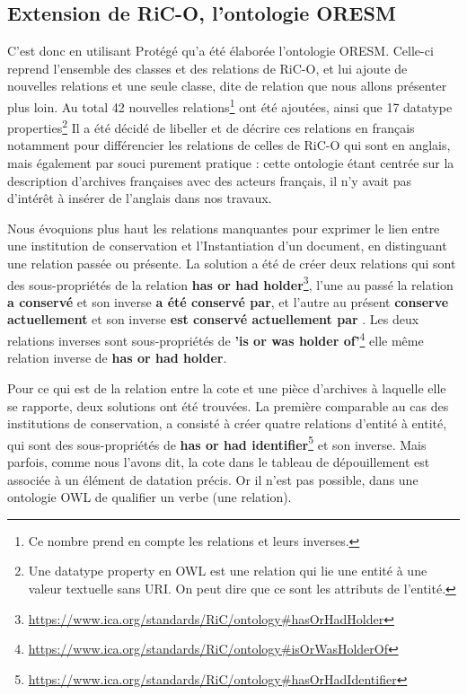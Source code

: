 \subsection{Extension de RiC-O, l'ontologie ORESM}
C'est donc en utilisant Protégé qu'a été élaborée l'ontologie ORESM. Celle-ci reprend l'ensemble des classes et des relations de RiC-O, et lui ajoute de nouvelles relations et une seule classe, dite de relation que nous allons présenter plus loin. Au total 42 nouvelles relations\footnote{Ce nombre prend en compte les relations et leurs inverses.} ont été ajoutées, ainsi que 17 datatype properties\footnote{Une datatype property en OWL est une relation qui lie une entité à une valeur textuelle sans URI. On peut dire que ce sont les attributs de l'entité.} Il a été décidé de libeller et de décrire ces relations en français notamment pour différencier les relations de celles de RiC-O qui sont en anglais, mais également par souci purement pratique : cette ontologie étant centrée sur la description d'archives françaises avec des acteurs français, il n'y avait pas d'intérêt à insérer de l'anglais dans nos travaux. 
\par
Nous évoquions plus haut les relations manquantes pour exprimer le lien entre une institution de conservation et l'Instantiation d'un document, en distinguant une relation passée ou présente. La solution a été de créer deux relations qui sont des sous-propriétés de la relation \textbf{has or had holder}\footnote{\href{https://www.ica.org/standards/RiC/ontology\#hasOrHadHolder}{https://www.ica.org/standards/RiC/ontology\#hasOrHadHolder}}, l'une au passé la relation \textbf{a conservé} et son inverse \textbf{a été conservé par}, et l'autre au présent \textbf{conserve actuellement} et son inverse \textbf{est conservé actuellement par} . Les deux relations inverses sont sous-propriétés de \textbf{'is or was holder of'}\footnote{\href{https://www.ica.org/standards/RiC/ontology\#isOrWasHolderOf}{https://www.ica.org/standards/RiC/ontology\#isOrWasHolderOf}} elle même relation inverse de \textbf{has or had holder}.
\par
Pour ce qui est de la relation entre la cote et une pièce d'archives à laquelle elle se rapporte, deux solutions ont été trouvées. La première comparable au cas des institutions de conservation, a consisté à créer quatre relations d'entité à entité, qui sont des sous-propriétés de \textbf{has or had identifier}\footnote{\href{https://www.ica.org/standards/RiC/ontology\#hasOrHadIdentifier}{https://www.ica.org/standards/RiC/ontology\#hasOrHadIdentifier}} et son inverse. Mais parfois, comme nous l'avons dit, la cote dans le tableau de dépouillement est associée à un élément de datation précis. Or il n'est pas possible, dans une ontologie OWL de qualifier un verbe (une relation). 
